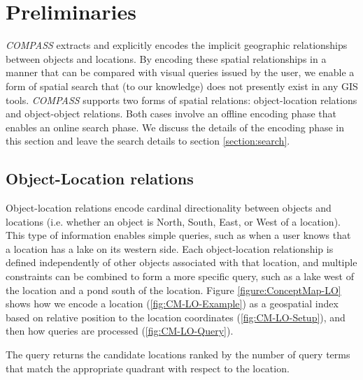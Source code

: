 \section{Preliminaries}
\label{section:prelim}

\emph{COMPASS} extracts and explicitly encodes the implicit geographic relationships between objects and locations. 
By encoding these spatial relationships in a manner that can be compared with visual queries issued by the user, we enable a form of spatial search that (to our knowledge) does not presently exist in any GIS tools.
\emph{COMPASS} supports two forms of spatial relations: object-location relations and object-object relations.
Both cases involve an offline encoding phase that enables an online search phase. 
We discuss the details of the encoding phase in this section and leave the search details to section \ref{section:search}.


\subsection{Object-Location relations}
Object-location relations encode cardinal directionality between objects and locations (i.e. whether an object is North, South, East, or West of a location). 
This type of information enables simple queries, such as when a user knows that a location has a lake on its western side. 
Each object-location relationship is defined independently of other objects associated with that location, and multiple constraints can be combined to form a more specific query, such as a lake west of the location and a pond south of the location.
Figure \ref{figure:ConceptMap-LO} shows how we encode a location (\ref{fig:CM-LO-Example}) as a geospatial index based on relative position to the location coordinates (\ref{fig:CM-LO-Setup}), and then how queries are processed (\ref{fig:CM-LO-Query}).

The query returns the candidate locations ranked by the number of query terms that match the appropriate quadrant with respect to the location. 

